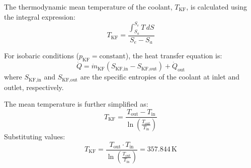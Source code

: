 The thermodynamic mean temperature of the coolant, \( T_{\text{KF}} \), is calculated using the integral expression:  
\[
T_{\text{KF}} = \frac{\int_{S_a}^{S_e} T \, dS}{S_e - S_a}
\]  

For isobaric conditions (\( p_{\text{KF}} = \text{constant} \)), the heat transfer equation is:  
\[
\dot{Q} = \dot{m}_{\text{KF}} (S_{\text{KF,in}} - S_{\text{KF,out}}) + \dot{Q}_{\text{out}}
\]  
where \( S_{\text{KF,in}} \) and \( S_{\text{KF,out}} \) are the specific entropies of the coolant at inlet and outlet, respectively.  

The mean temperature is further simplified as:  
\[
T_{\text{KF}} = \frac{T_{\text{out}} - T_{\text{in}}}{\ln \left( \frac{T_{\text{out}}}{T_{\text{in}}} \right)}
\]  
Substituting values:  
\[
T_{\text{KF}} = \frac{T_{\text{out}} \cdot T_{\text{in}}}{\ln \left( \frac{T_{\text{out}}}{T_{\text{in}}} \right)} = 357.844 \, \text{K}
\]